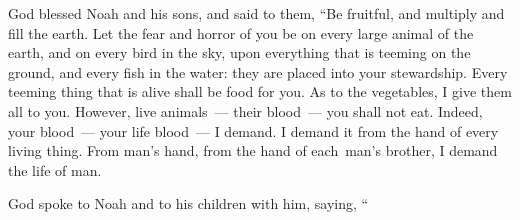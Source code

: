 
\begin{inparaenum}
     God blessed Noah and his sons, and said to them, ``Be fruitful, and multiply and fill the earth.%
     Let the fear and horror of you be on every large animal of the earth, and on every bird in the sky, upon everything that is teeming on the ground, and every fish in the water: they are placed into your stewardship.%
     Every teeming thing that is alive shall be food for you. As to the vegetables, I give them all to you.%
     However, live animals~--- their blood~--- you shall not eat.%
     Indeed, your blood~--- your life blood\understood~--- I demand. I demand it from the hand of every living thing. From man's hand, from the hand of each\understood\ man's brother, I demand the life of man.%
    
    
    
    
     God spoke to Noah and to his children with him, saying,%
     ``%
    
    
    
\end{inparaenum}
